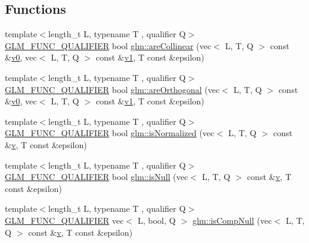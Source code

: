 \subsection*{Functions}
\begin{DoxyCompactItemize}
\item 
{\footnotesize template$<$length\+\_\+t L, typename T , qualifier Q$>$ }\\\hyperlink{setup_8hpp_a33fdea6f91c5f834105f7415e2a64407}{G\+L\+M\+\_\+\+F\+U\+N\+C\+\_\+\+Q\+U\+A\+L\+I\+F\+I\+ER} bool \hyperlink{group__gtx__vector__query_ga13da4a787a2ff70e95d561fb19ff91b4}{glm\+::are\+Collinear} (vec$<$ L, T, Q $>$ const \&\hyperlink{_s_d_l__opengl__glext_8h_a7062a23d1d434121d4a88f530703d06a}{v0}, vec$<$ L, T, Q $>$ const \&\hyperlink{_s_d_l__opengl__glext_8h_a435c176a02c061b43e19bdf7c86cceae}{v1}, T const \&epsilon)
\item 
{\footnotesize template$<$length\+\_\+t L, typename T , qualifier Q$>$ }\\\hyperlink{setup_8hpp_a33fdea6f91c5f834105f7415e2a64407}{G\+L\+M\+\_\+\+F\+U\+N\+C\+\_\+\+Q\+U\+A\+L\+I\+F\+I\+ER} bool \hyperlink{group__gtx__vector__query_gac7b95b3f798e3c293262b2bdaad47c57}{glm\+::are\+Orthogonal} (vec$<$ L, T, Q $>$ const \&\hyperlink{_s_d_l__opengl__glext_8h_a7062a23d1d434121d4a88f530703d06a}{v0}, vec$<$ L, T, Q $>$ const \&\hyperlink{_s_d_l__opengl__glext_8h_a435c176a02c061b43e19bdf7c86cceae}{v1}, T const \&epsilon)
\item 
{\footnotesize template$<$length\+\_\+t L, typename T , qualifier Q$>$ }\\\hyperlink{setup_8hpp_a33fdea6f91c5f834105f7415e2a64407}{G\+L\+M\+\_\+\+F\+U\+N\+C\+\_\+\+Q\+U\+A\+L\+I\+F\+I\+ER} bool \hyperlink{group__gtx__vector__query_gac3c974f459fd75453134fad7ae89a39e}{glm\+::is\+Normalized} (vec$<$ L, T, Q $>$ const \&\hyperlink{_s_d_l__opengl_8h_a10a82eabcb59d2fcd74acee063775f90}{v}, T const \&epsilon)
\item 
{\footnotesize template$<$length\+\_\+t L, typename T , qualifier Q$>$ }\\\hyperlink{setup_8hpp_a33fdea6f91c5f834105f7415e2a64407}{G\+L\+M\+\_\+\+F\+U\+N\+C\+\_\+\+Q\+U\+A\+L\+I\+F\+I\+ER} bool \hyperlink{group__gtx__vector__query_gab4a3637dbcb4bb42dc55caea7a1e0495}{glm\+::is\+Null} (vec$<$ L, T, Q $>$ const \&\hyperlink{_s_d_l__opengl_8h_a10a82eabcb59d2fcd74acee063775f90}{v}, T const \&epsilon)
\item 
{\footnotesize template$<$length\+\_\+t L, typename T , qualifier Q$>$ }\\\hyperlink{setup_8hpp_a33fdea6f91c5f834105f7415e2a64407}{G\+L\+M\+\_\+\+F\+U\+N\+C\+\_\+\+Q\+U\+A\+L\+I\+F\+I\+ER} vec$<$ L, bool, Q $>$ \hyperlink{group__gtx__vector__query_gaf6ec1688eab7442fe96fe4941d5d4e76}{glm\+::is\+Comp\+Null} (vec$<$ L, T, Q $>$ const \&\hyperlink{_s_d_l__opengl_8h_a10a82eabcb59d2fcd74acee063775f90}{v}, T const \&epsilon)

\end{DoxyCompactItemize}
